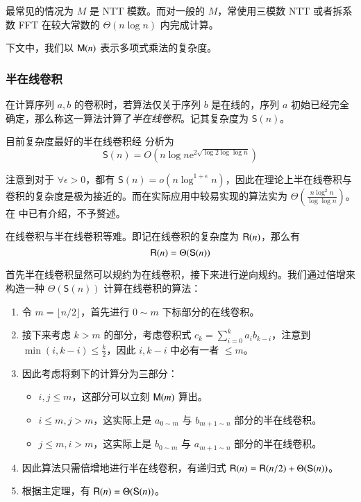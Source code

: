 最常见的情况为 $M$ 是 NTT 模数。而对一般的 $M$，常使用三模数 NTT 或者拆系数 FFT 在较大常数的 $\Theta(n\log n)$ 内完成计算。

下文中，我们以 $\mathsf M(n)$ 表示多项式乘法的复杂度。

\subsubsection{半在线卷积}

\begin{definition}[半在线卷积]
在计算序列 $a,b$ 的卷积时，若算法仅关于序列 $b$ 是在线的，序列 $a$ 初始已经完全确定，那么称这一算法计算了\emph{半在线卷积}。记其复杂度为 $\mathsf S(n)$。
\end{definition}

\begin{theorem}

目前复杂度最好的半在线卷积经 \cite{relaxmul} 分析为
$$
\mathsf{S}(n) = O\left(n\log n\mathrm{e}^{2\sqrt{\log 2\log\log n}}\right)
$$
\end{theorem}

注意到对于 $\forall \epsilon > 0$，都有 $\mathsf{S}(n) = o\left(n\log^{1+\epsilon} n\right)$，因此在理论上半在线卷积与卷积的复杂度是极为接近的。而在实际应用中较易实现的算法实为 $\Theta \left( \frac{n\log ^2 n}{\log \log n} \right)$。在 \cite{nimberpoly} 中已有介绍，不予赘述。

\begin{theorem}
在线卷积与半在线卷积等难。即记在线卷积的复杂度为 $\mathsf R(n)$，那么有
$$
\mathsf R(n)=\Theta(\mathsf S(n))
$$
\end{theorem}

首先半在线卷积显然可以规约为在线卷积，接下来进行逆向规约。我们通过倍增来构造一种 $\Theta(\mathsf S(n))$ 计算在线卷积的算法：

\begin{enumerate}
\item 令 $m=\lfloor n/2\rfloor$，首先进行 $0\sim m$ 下标部分的在线卷积。
\item 接下来考虑 $k > m$ 的部分，考虑卷积式 $c_k = \sum_{i=0}^k a_ib_{k-i}$，注意到 $\min(i,k-i)\le \frac k2$，因此 $i,k-i$ 中必有一者 $\le m$。
\item 因此考虑将剩下的计算分为三部分：
\begin{itemize}
\item $i,j\le m$，这部分可以立刻 $\mathsf M(m)$ 算出。 
\item $i\le m,j>m$，这实际上是 $a_{0\sim m}$ 与 $b_{m+1\sim n}$ 部分的半在线卷积。
\item $j\le m,i>m$，这实际上是 $b_{0\sim m}$ 与 $a_{m+1\sim n}$ 部分的半在线卷积。
\end{itemize}
\item 因此算法只需倍增地进行半在线卷积，有递归式 $\mathsf R(n) = \mathsf R(n/2) + \Theta(\mathsf S(n))$。
\item 根据主定理，有 $\mathsf R(n)=\Theta(\mathsf S(n))$。
\end{enumerate}

